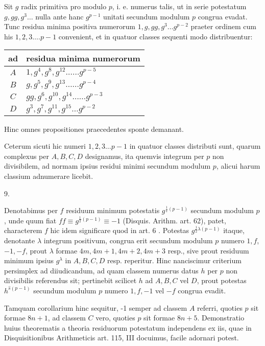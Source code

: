 \documentclass[10pt]{article}
\begin{document}
Sit \(g\) radix primitiva pro modulo \(p\), i. e. numerus talis, ut in serie potestatum \(g, g g, g^{3} \ldots\) nulla ante hanc \(g^{p-1}\) unitati secundum modulum \(p\) congrua evadat. Tunc residua minima positiva numerorum \(1, g, g g, g^{3} \ldots g^{p-2}\) praeter ordinem cum his \(1,2,3 \ldots . p-1\) convenient, et in quatuor classes sequenti modo distribuentur:

\begin{center}
\begin{tabular}{c|l}
ad & residua minima numerorum \\
\hline
\(A\) & \(1, g^{4}, g^{8}, g^{12} \ldots \ldots g^{p-5}\) \\
\(B\) & \(g, g^{5}, g^{9}, g^{13} \ldots \ldots g^{p-4}\) \\
\(C\) & \(g g, g^{6}, g^{10}, g^{14} \ldots \ldots g^{p-3}\) \\
\(D\) & \(g^{3}, g^{7}, g^{11}, g^{15} \ldots g^{p-2}\) \\
\end{tabular}
\end{center}

Hinc omnes propositiones praecedentes sponte demanant.

Ceterum sicuti hic numeri \(1,2,3 \ldots p-1\) in quatuor classes distributi sunt, quarum complexus per \(A, B, C, D\) designamus, ita quemvis integrum per \(p\) non divisibilem, ad normam ipsius residui minimi secundum modulum \(p\), alicui harum classium adnumerare licebit.

9.

Denotabimus per \(f\) residuum minimum potestatis \(g^{\frac{1}{1}(p-1)}\) secundum modulum \(p\), unde quum fiat \(f f \equiv g^{\frac{1}{2}(p-1)} \equiv-1\) (Disquis. Arithm. art. 62), patet, characterem \(f\) hic idem significare quod in art. 6 . Potestas \(g^{\frac{1}{2} \lambda(p-1)}\) itaque, denotante \(\lambda\) integrum positivum, congrua erit secundum modulum \(p\) numero \(1, f\), \(-1,-f\), prout \(\lambda\) formae \(4 m, 4 m+1,4 m+2,4 m+3\) resp., sive prout residuum minimum ipsius \(g^{\lambda}\) in \(A, B, C, D\) resp. reperitur. Hinc nanciscimur criterium persimplex ad diiudicandum, ad quam classem numerus datus \(h\) per \(p\) non divisibilis referendus sit; pertinebit scilicet \(h\) ad \(A, B, C\) vel \(D\), prout potestas \(h^{\hat{s}(p-1)}\) secundum modulum \(p\) numero \(1, f,-1\) vel \(-f\) congrua evadit.

Tamquam corollarium hinc sequitur, -1 semper ad classem \(A\) referri, quoties \(p\) sit formae \(8 n+1\), ad classem \(C\) vero, quoties \(p\) sit formae \(8 n+5\). Demonstratio huius theorematis a theoria residuorum potestatum independens ex iis, quae in Disquisitionibus Arithmeticis art. 115, III docuimus, facile adornari potest.
\end{document}
